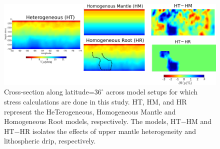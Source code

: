 \documentclass[draft,linenumbers]{agujournal2018}
\begin{document}
\begin{figure}[h!]
    \centering
    \includegraphics[width=\linewidth]{figures/model_differences_updated.png}
    \caption{Cross-section along latitude=$36^\circ$ across model setups for which stress calculations are done in this study. HT, HM, and HR represent the HeTerogeneous, Homogeneous Mantle and Homogeneous Root models, respectively. The models, HT$-$HM and HT$-$HR isolates the effects of upper mantle heterogeneity and lithospheric drip, respectively.}
    \label{model_differences}
\end{figure}
\end{document}
